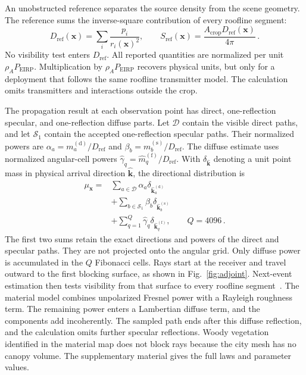 \documentclass{ieeeaccess}
\begin{document}
An unobstructed reference separates the source density from the scene geometry. The reference sums the inverse-square contribution of every roofline segment:
\begin{equation}
D_{\mathrm{ref}}(\mathbf{x})=
\sum_i\frac{p_i}{r_i(\mathbf{x})^2},
\qquad
S_{\mathrm{ref}}(\mathbf{x})=
\frac{A_{\mathrm{crop}}D_{\mathrm{ref}}(\mathbf{x})}{4\pi} \, .
\label{eq:reference-scale}
\end{equation}
No visibility test enters $D_{\mathrm{ref}}$. All reported quantities are
normalized per unit $\rho_A P_{\mathrm{EIRP}}$. Multiplication by
$\rho_A P_{\mathrm{EIRP}}$ recovers physical units, but only for a deployment
that follows the same roofline transmitter model. The calculation omits
transmitters and interactions outside the crop.

The propagation result at each observation point has direct, one-reflection
specular, and one-reflection diffuse parts. Let $\mathcal{D}$ contain the visible direct
paths, and let $\mathcal{S}_1$ contain the accepted one-reflection specular
paths. Their normalized powers are
$\alpha_a=m_a^{(\mathrm{d})}/D_{\mathrm{ref}}$ and
$\beta_b=m_b^{(\mathrm{s})}/D_{\mathrm{ref}}$. The diffuse estimate uses
normalized angular-cell powers
$\widehat{\gamma}_q=\widehat{m}_q^{(\mathrm{f})}/D_{\mathrm{ref}}$. With
$\delta_{\widehat{\mathbf{k}}}$ denoting a unit point mass in physical arrival
direction $\widehat{\mathbf{k}}$, the directional distribution is
\begin{equation}
\begin{aligned}
\mu_{\mathbf{x}}={}&
\sum_{a\in\mathcal{D}}\alpha_a\delta_{\widehat{\mathbf{k}}_a^{(\mathrm{d})}} \\
&+\sum_{b\in\mathcal{S}_1}\beta_b\delta_{\widehat{\mathbf{k}}_b^{(\mathrm{s})}} \\
&+\sum_{q=1}^{Q}\widehat{\gamma}_q\delta_{\widehat{\mathbf{k}}_q^{(\mathrm{f})}},
\qquad Q=4096 \, .
\end{aligned}
\label{eq:first-material-transfer}
\end{equation}
The first two sums retain the exact directions and powers of the direct and
specular paths. They are not projected onto the angular grid. Only diffuse
power is accumulated in the $Q$ Fibonacci cells. Rays start at the receiver and
travel outward to the first blocking surface, as shown in
Fig.~\ref{fig:adjoint}. Next-event estimation then tests visibility from that surface to every roofline
segment~\cite{veach}. The
material model combines unpolarized Fresnel power with a Rayleigh roughness
term. The remaining power enters a Lambertian diffuse term, and the components
add incoherently. The sampled path ends after this diffuse reflection, and the
calculation omits further specular reflections. Woody vegetation identified in
the material map does not block rays because the city mesh has no canopy
volume. The supplementary material gives the full laws and parameter values.
\end{document}
